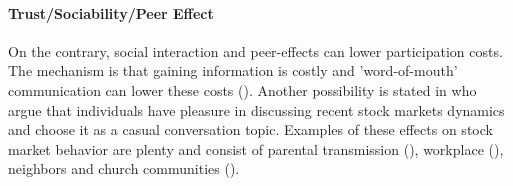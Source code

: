 \documentclass[ProjectABM]{subfiles}
\begin{document}
\paragraph{Trust/Sociability/Peer Effect}
On the contrary, social interaction and peer-effects can lower participation costs. %
The mechanism is that gaining information is costly and 'word-of-mouth' communication can lower these costs (\cite{brown_2008}). Another possibility is stated in \cite{hong_et_al_2004social} who argue that individuals have pleasure in discussing recent stock markets dynamics and choose it as a casual conversation topic. Examples of these effects on stock market behavior are plenty and consist of parental transmission (\cite{CS2000_parental}), workplace (\cite{duflo_saez2002_workplace}), neighbors and church communities (\cite{hong_et_al_2004social, brown_2008}).





\end{document}
